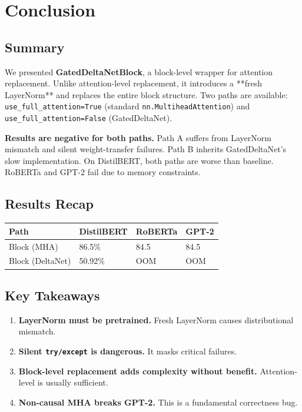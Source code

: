 
\section{Conclusion}

\subsection{Summary}

We presented \textbf{GatedDeltaNetBlock}, a block-level wrapper for attention 
replacement. Unlike attention-level replacement, it introduces a **fresh 
LayerNorm** and replaces the entire block structure. Two paths are 
available: \texttt{use\_full\_attention=True} (standard \texttt{nn.MultiheadAttention}) 
and \texttt{use\_full\_attention=False} (GatedDeltaNet).

\textbf{Results are negative for both paths.} Path A suffers from LayerNorm 
mismatch and silent weight-transfer failures. Path B inherits GatedDeltaNet's 
slow implementation. On DistilBERT, both paths are worse than baseline. 
RoBERTa and GPT-2 fail due to memory constraints.

\subsection{Results Recap}

\begin{table}[H]
\centering
\small
\begin{tabular}{llll}
\toprule
\textbf{Path} & \textbf{DistilBERT} & \textbf{RoBERTa} & \textbf{GPT-2} \\
\midrule
Block (MHA) & 86.5\% & 84.5 & 84.5 \\
Block (DeltaNet) & 50.92\% & OOM & OOM \\
\bottomrule
\end{tabular}
\end{table}

\subsection{Key Takeaways}

\begin{enumerate}
\item \textbf{LayerNorm must be pretrained.} Fresh LayerNorm causes distributional
  mismatch.
\item \textbf{Silent \texttt{try/except} is dangerous.} It masks critical failures.
\item \textbf{Block-level replacement adds complexity without benefit.} Attention-level
  is usually sufficient.
\item \textbf{Non-causal MHA breaks GPT-2.} This is a fundamental correctness bug.

\end{enumerate}
